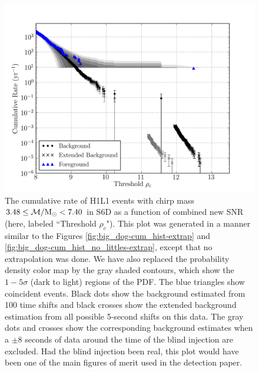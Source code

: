 \begin{figure}[p]
\center
\label{fig:big_dog-rate_plot}
\includegraphics[width=6in]{figures/big_dog/H1L1V1-lalapps_cbc_plotrates_FINAL_PLOT_cumulative_F1_ALL_DATA_PLOTTED_OPEN_BOX-961545543-10076544.png}
\caption{The cumulative rate of H1L1 events with chirp mass $3.48 \le \mathcal{M}/\mathrm{M_\odot}
< 7.40$ in S6D as a function of combined new \ac{SNR} (here, labeled
``Threshold $\rho_c$"). This plot was generated in a manner similar to the
Figures \ref{fig:big_dog-cum_hist-extrap} and
\ref{fig:big_dog-cum_hist_no_littles-extrap}, except that no extrapolation was
done. We have also replaced the probability density color map by the gray
shaded contours, which show the $1 - 5\sigma$ (dark to light) regions of the
\ac{PDF}. The blue triangles show coincident events.  Black dots show the
background estimated from 100 time shifts and black crosses show the extended
background estimation from all possible 5-second shifts on this data.  The gray
dots and crosses show the corresponding background estimates when a $\pm 8$
seconds of data around the time of the blind injection are excluded. Had the
blind injection been real, this plot would have been one of the main figures of
merit used in the detection paper.}
\end{figure}
